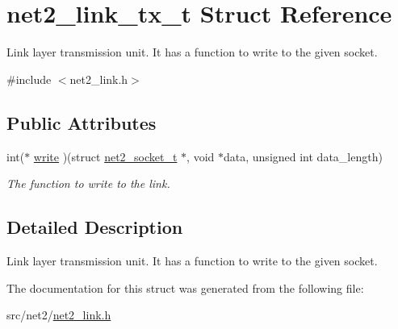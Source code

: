 \hypertarget{structnet2__link__tx__t}{}\section{net2\+\_\+link\+\_\+tx\+\_\+t Struct Reference}
\label{structnet2__link__tx__t}


Link layer transmission unit. It has a function to write to the given socket.  




{\ttfamily \#include $<$net2\+\_\+link.\+h$>$}

\subsection*{Public Attributes}
\begin{DoxyCompactItemize}
\item 
\hypertarget{structnet2__link__tx__t_a245a9b9873efaf40600057ec8c8023db}{}int($\ast$ \hyperlink{structnet2__link__tx__t_a245a9b9873efaf40600057ec8c8023db}{write} )(struct \hyperlink{structnet2__socket__t}{net2\+\_\+socket\+\_\+t} $\ast$, void $\ast$data, unsigned int data\+\_\+length)\label{structnet2__link__tx__t_a245a9b9873efaf40600057ec8c8023db}

\begin{DoxyCompactList}\small\item\em The function to write to the link. \end{DoxyCompactList}\end{DoxyCompactItemize}


\subsection{Detailed Description}
Link layer transmission unit. It has a function to write to the given socket. 

The documentation for this struct was generated from the following file\+:\begin{DoxyCompactItemize}
\item 
src/net2/\hyperlink{net2__link_8h}{net2\+\_\+link.\+h}\end{DoxyCompactItemize}

